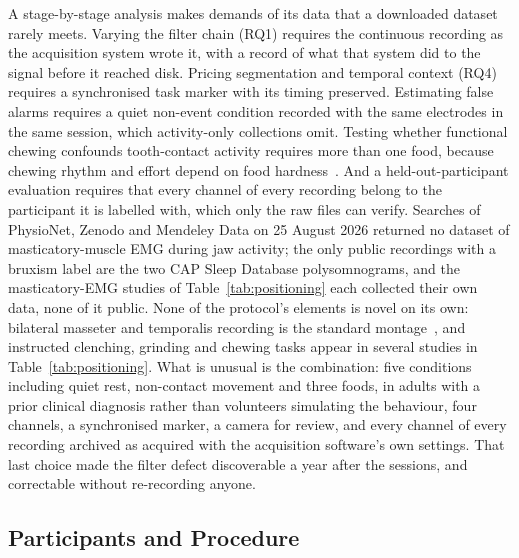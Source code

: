 \documentclass[journal]{IEEEtran}
\begin{document}
A stage-by-stage analysis makes demands of its data that a downloaded dataset rarely meets. Varying the filter chain (RQ1) requires the continuous recording as the acquisition system wrote it, with a record of what that system did to the signal before it reached disk. Pricing segmentation and temporal context (RQ4) requires a synchronised task marker with its timing preserved. Estimating false alarms requires a quiet non-event condition recorded with the same electrodes in the same session, which activity-only collections omit. Testing whether functional chewing confounds tooth-contact activity requires more than one food, because chewing rhythm and effort depend on food hardness~\cite{zhang2018monitoring}. And a held-out-participant evaluation requires that every channel of every recording belong to the participant it is labelled with, which only the raw files can verify. Searches of PhysioNet, Zenodo and Mendeley Data on 25 August 2026 returned no dataset of masticatory-muscle EMG during jaw activity; the only public recordings with a bruxism label are the two CAP Sleep Database polysomnograms, and the masticatory-EMG studies of Table~\ref{tab:positioning} each collected their own data, none of it public. None of the protocol's elements is novel on its own: bilateral masseter and temporalis recording is the standard montage~\cite{ferrario2000electromyographic,castroflorio2005reproducibility}, and instructed clenching, grinding and chewing tasks appear in several studies in Table~\ref{tab:positioning}. What is unusual is the combination: five conditions including quiet rest, non-contact movement and three foods, in adults with a prior clinical diagnosis rather than volunteers simulating the behaviour, four channels, a synchronised marker, a camera for review, and every channel of every recording archived as acquired with the acquisition software's own settings. That last choice made the filter defect discoverable a year after the sessions, and correctable without re-recording anyone.

\subsection{Participants and Procedure}
\end{document}
